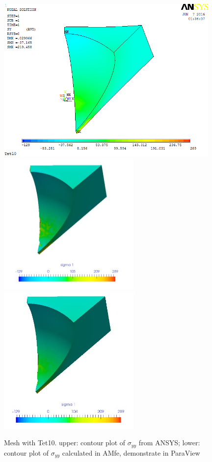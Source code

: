 \begin{figure}[htbp]
	\begin{center}
		\includegraphics[width=11cm,clip]{Tet10_Syy.png} 	
		\includegraphics[width=7cm,clip]{Tet10_Syy_PD.png} 			
		\includegraphics[width=7cm,clip]{Tet10_Syy_P.png} 		
		\caption{Mesh with Tet10. upper: contour plot of $\sigma_{yy}$ from ANSYS; lower: contour plot of $\sigma_{yy}$ calculated in AMfe, demonstrate in ParaView} \label{fig: Tet10_Syy}
	\end{center}
\end{figure}
\clearpage 

